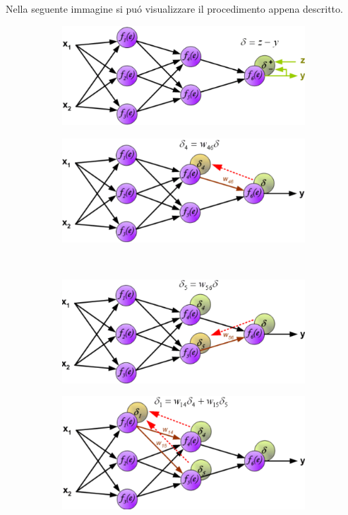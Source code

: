 \documentclass[a4paper,12pt]{report}
\begin{document}
 Nella seguente immagine si pu\'o visualizzare il procedimento appena descritto.
 
 \begin{figure}[h!]
  \centering
  \begin{subfigure}[b]{0.45\linewidth}
   \includegraphics[width=\linewidth]{BackPropa.png}
  \end{subfigure}
  \begin{subfigure}[b]{0.45\linewidth}
   \includegraphics[width=\linewidth]{BackPropb.png}
  \end{subfigure}
  \\
  \begin{subfigure}[b]{0.45\linewidth}
   \includegraphics[width=\linewidth]{BackPropc.png}
  \end{subfigure}
  \begin{subfigure}[b]{0.45\linewidth}
   \includegraphics[width=\linewidth]{BackPropd.png}

\end{subfigure}
\end{figure}
\end{document}
